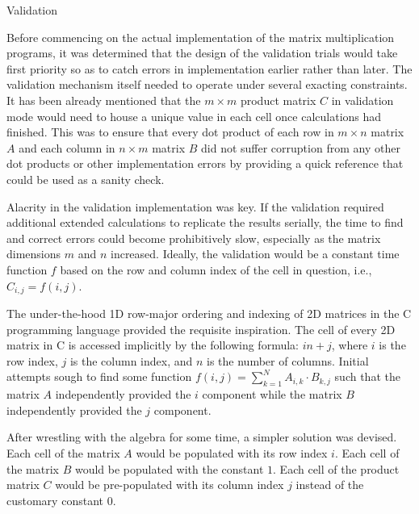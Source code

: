 \documentclass{article}
\begin{document}
\begin{section}{Validation}
  \begin{paragraph}{}
    Before commencing on the actual implementation of the matrix multiplication programs, it was determined that the design of
    the validation trials would take first priority so as to catch errors in implementation earlier rather than later.
    The validation mechanism itself needed to operate under several exacting constraints. It has been already mentioned
    that the $m \times m$ product matrix $C$ in validation mode would need to house a unique value in each cell once calculations had finished.
    This was to ensure that every dot product of each row in $m \times n$ matrix $A$ and each column in $n \times m$ matrix $B$ did not suffer corruption
    from any other dot products or other implementation errors by providing a quick reference that could be used as a sanity check.
  \end{paragraph}
  \begin{paragraph}{}
    Alacrity in the validation implementation was key. If the validation required additional extended calculations to replicate the results serially,
    the time to find and correct errors could become prohibitively slow, especially as the matrix dimensions $m$ and $n$ increased.
    Ideally, the validation would be a constant time function $f$ based on the row and column index of the cell in question, i.e.,
    $C_{i,j} = f(i,j)$.
  \end{paragraph}
  \begin{paragraph}{}
    The under-the-hood 1D row-major ordering and indexing of 2D matrices in the C programming language provided the requisite inspiration.
    The cell of every 2D matrix in C is accessed implicitly by the following formula: $in +j$, where $i$ is the row index,
    $j$ is the column index, and $n$ is the number of columns\autocite[][113]{KnR}. Initial attempts sough to find some function $f(i,j) = \displaystyle\sum_{k=1}^{N} A_{i,k} \cdot B_{k,j}$
    such that the matrix $A$ independently provided the $i$ component while the matrix $B$ independently provided the $j$ component.
  \end{paragraph}
  \begin{paragraph}{}
    After wrestling with the algebra for some time, a simpler solution was devised. Each cell of the matrix $A$
    would be populated with its row index $i$. Each cell of the matrix $B$ would be populated with the constant $1$.
    Each cell of the product matrix $C$ would be pre-populated with its column index $j$ instead of the customary constant $0$.

\end{paragraph}
\end{section}
\end{document}
